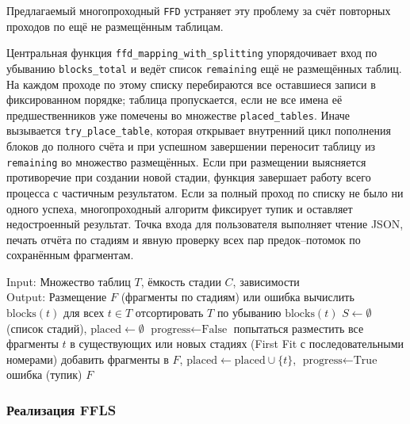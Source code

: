 Предлагаемый многопроходный \texttt{FFD} устраняет эту проблему за счёт повторных проходов по ещё не размещённым таблицам.

Центральная функция \texttt{ffd\_mapping\_with\_splitting} упорядочивает вход по убыванию \texttt{blocks\_total} и ведёт список \texttt{remaining} ещё не размещённых таблиц. На каждом проходе по этому списку перебираются все оставшиеся записи в фиксированном порядке; таблица пропускается, если не все имена её предшественников уже помечены во множестве \texttt{placed\_tables}. Иначе вызывается \texttt{try\_place\_table}, которая открывает внутренний цикл пополнения блоков до полного счёта и при успешном завершении переносит таблицу из \texttt{remaining} во множество размещённых. Если при размещении выясняется противоречие при создании новой стадии, функция завершает работу всего процесса с частичным результатом. Если за полный проход по списку не было ни одного успеха, многопроходный алгоритм фиксирует тупик и оставляет недостроенный результат. Точка входа для пользователя выполняет чтение JSON, печать отчёта по стадиям и явную проверку всех пар предок--потомок по сохранённым фрагментам.

\begin{algorithm}[H]
	\caption{Многопроходный FFD с разрезанием}
	\begin{algorithmic}[1]
		Input: Множество таблиц $T$, ёмкость стадии $C$, зависимости \\
		Output: Размещение $F$ (фрагменты по стадиям) или ошибка
		\STATE вычислить $\text{blocks}(t)$ для всех $t \in T$
		\STATE отсортировать $T$ по убыванию $\text{blocks}(t)$
		\STATE $S \gets \emptyset$ (список стадий), $\text{placed} \gets \emptyset$
		\STATE $\text{progress} \gets \text{False}$
		\STATE попытаться разместить все фрагменты $t$ в существующих или новых стадиях (First Fit с последовательными номерами)
		\STATE добавить фрагменты в $F$, $\text{placed} \gets \text{placed} \cup \{t\}$, $\text{progress} \gets \text{True}$
		\ENDIF
		\ENDIF
		\ENDFOR
		 \RETURN ошибка (тупик) \ENDIF
		\ENDWHILE
		\RETURN $F$
	\end{algorithmic}
\end{algorithm}





\subsubsection{Реализация FFLS}

